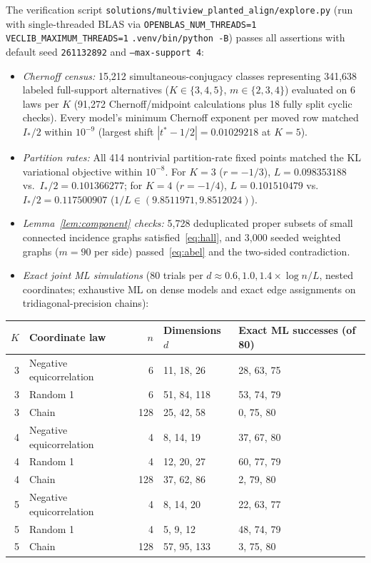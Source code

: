 \documentclass[11pt]{article}
\theoremstyle{plain}
\theoremstyle{definition}
\theoremstyle{remark}
\begin{document}
The verification script \texttt{solutions/multiview\_planted\_align/explore.py} (run with single-threaded BLAS via \texttt{OPENBLAS\_NUM\_THREADS=1} \texttt{VECLIB\_MAXIMUM\_THREADS=1} \texttt{.venv/bin/python -B}) passes all assertions with default seed \texttt{261132892} and \texttt{--max-support 4}:
\begin{itemize}[leftmargin=2em,itemsep=2pt]
\item \emph{Chernoff census:} 15,212 simultaneous-conjugacy classes representing 341,638 labeled full-support alternatives ($K \in \{3, 4, 5\}$, $m \in \{2, 3, 4\}$) evaluated on 6 laws per $K$ (91,272 Chernoff/midpoint calculations plus 18 fully split cyclic checks). Every model's minimum Chernoff exponent per moved row matched $I_*/2$ within $10^{-9}$ (largest shift $|t^* - 1/2| = 0.01029218$ at $K = 5$).
\item \emph{Partition rates:} All 414 nontrivial partition-rate fixed points matched the KL variational objective within $10^{-8}$. For $K = 3$ ($r = -1/3$), $L = 0.098353188$ vs.\ $I_*/2 = 0.101366277$; for $K = 4$ ($r = -1/4$), $L = 0.101510479$ vs.\ $I_*/2 = 0.117500907$ ($1/L \in (9.8511971, 9.8512024)$).
\item \emph{Lemma~\ref{lem:component} checks:} 5,728 deduplicated proper subsets of small connected incidence graphs satisfied~\eqref{eq:hall}, and 3,000 seeded weighted graphs ($m = 90$ per side) passed~\eqref{eq:abel} and the two-sided contradiction.
\item \emph{Exact joint ML simulations} (80 trials per $d \approx 0.6, 1.0, 1.4 \times \log n / L$, nested coordinates; exhaustive ML on dense models and exact edge assignments on tridiagonal-precision chains):
\end{itemize}

\begin{table}[h!]
\centering
\small
\begin{tabular}{@{}rlrll@{}}
\toprule
$K$ & Coordinate law & $n$ & Dimensions $d$ & Exact ML successes (of 80) \\
\midrule
3 & Negative equicorrelation & 6   & 11, 18, 26  & 28, 63, 75 \\
3 & Random 1                 & 6   & 51, 84, 118 & 53, 74, 79 \\
3 & Chain                    & 128 & 25, 42, 58  & 0, 75, 80  \\
4 & Negative equicorrelation & 4   & 8, 14, 19   & 37, 67, 80 \\
4 & Random 1                 & 4   & 12, 20, 27  & 60, 77, 79 \\
4 & Chain                    & 128 & 37, 62, 86  & 2, 79, 80  \\
5 & Negative equicorrelation & 4   & 8, 14, 20   & 22, 63, 77 \\
5 & Random 1                 & 4   & 5, 9, 12    & 48, 74, 79 \\
5 & Chain                    & 128 & 57, 95, 133 & 3, 75, 80  \\
\bottomrule
\end{tabular}
\end{table}
\end{document}
